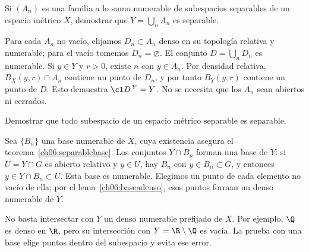 \begin{ejercicio}\label{ej:lectura-6-3}
Si $(A_n)$ es una familia a lo sumo numerable de subespacios separables de un espacio métrico $X$, demostrar que $Y=\bigcup_nA_n$ es separable.
\end{ejercicio}
\begin{solucion}
Para cada $A_n$ no vacío, elijamos $D_n\subset A_n$ denso en su topología relativa y numerable; para el vacío tomemos $D_n=\varnothing$. El conjunto $D=\bigcup_nD_n$ es numerable. Si $y\in Y$ y $r>0$, existe $n$ con $y\in A_n$. Por densidad relativa, $B_X(y,r)\cap A_n$ contiene un punto de $D_n$, y por tanto $B_Y(y,r)$ contiene un punto de $D$. Esto demuestra $\cl D^{\,Y}=Y$. No se necesita que los $A_n$ sean abiertos ni cerrados.
\end{solucion}

\begin{ejercicio}\label{ej:lectura-6-4}
Demostrar que todo subespacio de un espacio métrico separable es separable.
\end{ejercicio}
\begin{solucion}
Sea $\{B_n\}$ una base numerable de $X$, cuya existencia asegura el teorema~\ref{ch06:separablebase}. Los conjuntos $Y\cap B_n$ forman una base de $Y$: si $U=Y\cap G$ es abierto relativo y $y\in U$, hay $B_n$ con $y\in B_n\subset G$, y entonces $y\in Y\cap B_n\subset U$. Esta base es numerable. Elegimos un punto de cada elemento no vacío de ella; por el lema~\ref{ch06:baseadenso}, esos puntos forman un denso numerable de $Y$.

No basta intersectar con $Y$ un denso numerable prefijado de $X$. Por ejemplo, $\Q$ es denso en $\R$, pero su intersección con $Y=\R\setminus\Q$ es vacía. La prueba con una base elige puntos dentro del subespacio y evita ese error.
\end{solucion}

